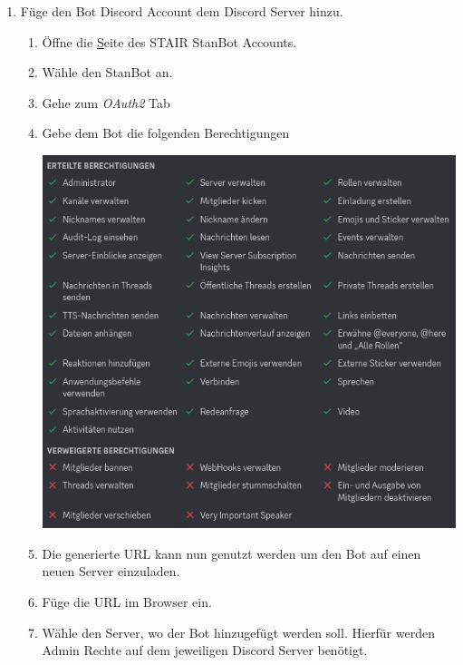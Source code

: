 \documentclass[a4paper, table]{article}
\begin{document}
\begin{enumerate}
    \item Füge den Bot Discord Account dem Discord Server hinzu.
        \begin{enumerate}
            \item Öffne die \href{https://discord.com/developers/applications} Seite des STAIR StanBot Accounts.
            \item Wähle den StanBot an.
            \item Gehe zum \textit{OAuth2} Tab
            \item Gebe dem Bot die folgenden Berechtigungen\par
                \begin{minipage}{\linewidth}
                    \centering
                    \includegraphics[width=1\textwidth]{img/berechtigungenBot.png}
                    \label{fig:berechtigungenBot}
                \end{minipage}
            \item Die generierte URL kann nun genutzt werden um den Bot auf einen neuen Server einzuladen.
            \item Füge die URL im Browser ein.
            \item Wähle den Server, wo der Bot hinzugefügt werden soll. Hierfür werden Admin Rechte auf dem jeweiligen Discord Server benötigt.
        \end{enumerate}

\end{enumerate}
\end{document}
